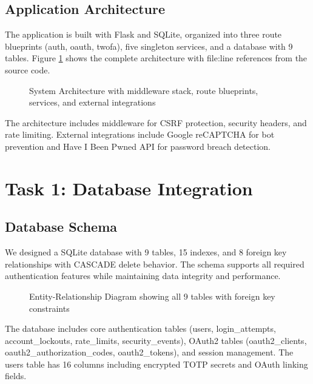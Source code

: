 \documentclass[12pt,a4paper]{article}
\begin{document}
\subsection{Application Architecture}

The application is built with Flask and SQLite, organized into three route blueprints (auth, oauth, twofa), five singleton services, and a database with 9 tables. Figure \ref{fig:architecture} shows the complete architecture with file:line references from the source code.

\begin{figure}[H]
    \centering
    
    \caption{System Architecture with middleware stack, route blueprints, services, and external integrations}
    \label{fig:architecture}
\end{figure}

The architecture includes middleware for CSRF protection, security headers, and rate limiting. External integrations include Google reCAPTCHA for bot prevention and Have I Been Pwned API for password breach detection.

\section{Task 1: Database Integration}

\subsection{Database Schema}

We designed a SQLite database with 9 tables, 15 indexes, and 8 foreign key relationships with CASCADE delete behavior. The schema supports all required authentication features while maintaining data integrity and performance.

\begin{figure}[H]
    \centering
    
    \caption{Entity-Relationship Diagram showing all 9 tables with foreign key constraints}
    \label{fig:database}
\end{figure}

The database includes core authentication tables (users, login\_attempts, account\_lockouts, rate\_limits, security\_events), OAuth2 tables (oauth2\_clients, oauth2\_authorization\_codes, oauth2\_tokens), and session management. The users table has 16 columns including encrypted TOTP secrets and OAuth linking fields.
\end{document}
